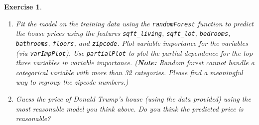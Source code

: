 \documentclass[12pt]{article}
\theoremstyle{colon}
\newtheorem{exercise}{Exercise}
\begin{document}
\begin{exercise}
\begin{enumerate}[label=\arabic*)]
    \item Fit the model on the training data using the \texttt{randomForest} function to predict the house prices using the features \texttt{sqft\_living}, \texttt{sqft\_lot}, \texttt{bedrooms}, \texttt{bathrooms}, \texttt{floors}, and \texttt{zipcode}. Plot variable importance for the variables (via \texttt{varImpPlot}). Use \texttt{partialPlot} to plot the partial dependence for the top three variables in variable importance.
      (\textbf{Note:} Random forest cannot handle a categorical variable with more than 32 categories. Please find a meaningful way to regroup the zipcode numbers.)

    \item Guess the price of Donald Trump's house (using the data provided) using the most reasonable model you think above. Do you think the predicted price is reasonable?
  \end{enumerate}
\end{exercise}
\end{document}

